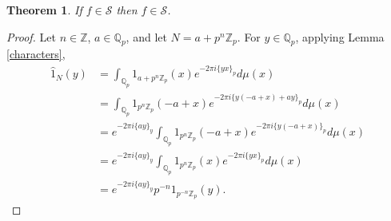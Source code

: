 \documentclass{article}
\newtheorem{theorem}{Theorem}
\theoremstyle{definition}
\begin{document}
\begin{theorem}
If $f \in \mathscr{S}$ then $\widehat{f} \in \mathscr{S}$.
\end{theorem}
\begin{proof}
Let $n \in \mathbb{Z}$, $a \in \mathbb{Q}_p$, and let $N=a+p^n \mathbb{Z}_p$. For $y \in \mathbb{Q}_p$,
applying Lemma \ref{characters},
\begin{align*}
\widehat{1}_N(y)&=\int_{\mathbb{Q}_p} 1_{a+p^n \mathbb{Z}_p}(x) e^{-2\pi i\{yx\}_p} d\mu(x)\\
&=\int_{\mathbb{Q}_p} 1_{p^n\mathbb{Z}_p}(-a+x) e^{-2\pi i\{y(-a+x)+ay\}_p} d\mu(x)\\
&=e^{-2\pi i\{ay\}_y}  \int_{\mathbb{Q}_p} 1_{p^n\mathbb{Z}_p}(-a+x) e^{-2\pi i\{y(-a+x)\}_p} d\mu(x)\\
&=e^{-2\pi i\{ay\}_y} \int_{\mathbb{Q}_p} 1_{p^n \mathbb{Z}_p}(x) e^{-2\pi i\{yx\}_p} d\mu(x)\\
&=e^{-2\pi i\{ay\}_y} p^{-n} 1_{p^{-n} \mathbb{Z}_p}(y).
\end{align*}
\end{proof}
\end{document}
